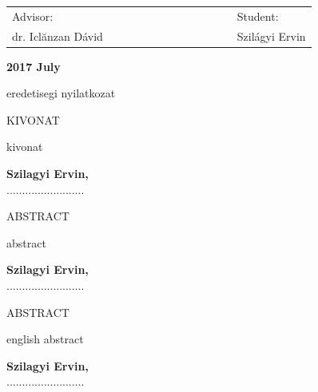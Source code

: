 \documentclass[12pt, a4paper, oneside]{book}
\theoremstyle{tetel}
\begin{document}
\vspace{2cm}
\begin{center}
\begin{tabular}{lcccccccccccl}
     Advisor: & & &&&& &&&&&& Student:\\
     dr. Iclănzan Dávid &&&&&& &&&&&& Szilágyi Ervin\\
\end{tabular}
\end{center}

\begin{center}
    \vspace{1cm}\textbf{2017 July}
\end{center}

\newpage
\thispagestyle{empty}
eredetisegi nyilatkozat
\newpage
\thispagestyle{empty}
\begin{center}
    \Large KIVONAT
\end{center}

kivonat

\begin{flushright}
\textbf{Szilagyi Ervin,}\\
.........................
\end{flushright}

\newpage
\thispagestyle{empty}
\begin{center}
    \Large ABSTRACT
\end{center}

abstract

\begin{flushright}
\textbf{Szilagyi Ervin,}\\
.........................
\end{flushright}

\newpage
\thispagestyle{empty}
\begin{center}
    \Large ABSTRACT
\end{center}

english abstract


\begin{flushright}
\textbf{Szilagyi Ervin,}\\
.........................
\end{flushright}
\end{document}
